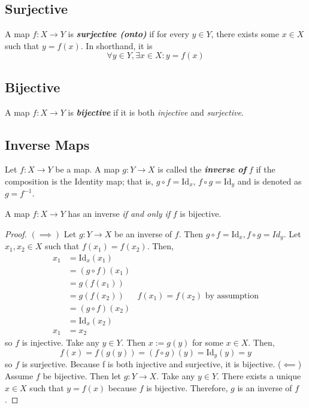 \documentclass{article}
\newcommand{\textib}[1]{\textit{\textbf{{#1}}}}
\newcommand{\Id}{\text{Id}}
\newcommand{\proposition}[1]{\begin{tcolorbox}[title=Proposition]{#1}\end{tcolorbox}}
\begin{document}
\subsection{Surjective}
A map $f : X \to Y$ is \textib{surjective (onto)} if for every $y \in Y$, there exists some $x \in X$
such that $y = f(x)$. In shorthand, it is
\[\forall y \in Y, \exists x \in X : y = f(x)\]


\subsection{Bijective}
A map $f : X \to Y$ is \textib{bijective} if it is both \textit{injective} and \textit{surjective}.


\subsection{Inverse Maps}
Let $f : X \to Y$ be a map. A map $g : Y \to X$ is called the \textib{inverse of} $f$ if the composition
is the Identity map; that is, $g \circ f = \Id_x$, $f \circ g = \Id_y$ and is denoted as $g = f^{-1}$.

\proposition{
    A map $f : X \to Y$ has an inverse \textit{if and only if} $f$ is bijective.
}
\begin{proof}
    $(\implies)$ Let $g : Y \to X$ be an inverse of $f$. Then $g \circ f = \Id_x, f \circ g = Id_y$.
    Let $x_1, x_2 \in X$ such that $f(x_1) = f(x_2)$. Then, 
    \begin{align*}
        x_1 &= \Id_x(x_1) \\
            &= (g \circ f)(x_1) \\
            &= g(f(x_1)) \\
            &= g(f(x_2)) & f(x_1) = f(x_2) \text{ by assumption} \\
            &= (g \circ f)(x_2) \\
            &= \Id_x(x_2) \\
        x_1 &= x_2
    \end{align*}
    so $f$ is injective.
    \newline
    \newline
    Take any $y \in Y$. Then $x := g(y)$ for some $x \in X$. Then, 
    \[f(x) = f(g(y)) = (f \circ g)(y) = \Id_y(y) = y\]
    so $f$ is surjective. Because f is both injective and surjective, it is bijective.
    \newline
    \newline
    ($\impliedby$) Assume $f$ be bijective. Then let $g : Y \to X$. Take any $y \in Y$. There
    exists a unique $x \in X$ such that $y = f(x)$ because $f$ is bijective. Therefore, $g$ is an
    inverse of $f$.
\end{proof}
\end{document}
